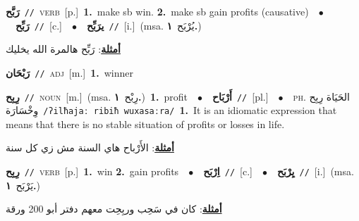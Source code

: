 \documentclass[10pt,a4paper,twoside]{article} %
\begin{document}
\begin{multicols}{2}
{\setlength\topsep{0pt}\textbf{\foreignlanguage{arabic}{رَبَّح}}\ {\color{gray}\texttt{//}\color{black}}\ \textsc{verb}\ [p.]\ \textbf{1.}~make sb win.  \textbf{2.}~make sb gain profits (causative)\ \ $\bullet$\ \ \setlength\topsep{0pt}\textbf{\foreignlanguage{arabic}{رَبِّح}}\ {\color{gray}\texttt{//}\color{black}}\ [c.]\ \ $\bullet$\ \ \setlength\topsep{0pt}\textbf{\foreignlanguage{arabic}{يرَبِّح}}\ {\color{gray}\texttt{//}\color{black}}\ [i.]\ \color{gray}(msa. \foreignlanguage{arabic}{يُرْبَح}~\foreignlanguage{arabic}{\textbf{١.}})\color{black}\  \begin{flushright}\color{gray}\foreignlanguage{arabic}{\textbf{\underline{\foreignlanguage{arabic}{أمثلة}}}: رَبِّح هالمرة الله يخليك}\end{flushright}\color{black}} \vspace{2mm}

{\setlength\topsep{0pt}\textbf{\foreignlanguage{arabic}{رَبْحَان}}\ {\color{gray}\texttt{//}\color{black}}\ \textsc{adj}\ [m.]\ \textbf{1.}~winner\ } \vspace{2mm}

{\setlength\topsep{0pt}\textbf{\foreignlanguage{arabic}{رِبِح}}\ {\color{gray}\texttt{//}\color{black}}\ \textsc{noun}\ [m.]\ \color{gray}(msa. \foreignlanguage{arabic}{رِبْح}~\foreignlanguage{arabic}{\textbf{١.}})\color{black}\ \textbf{1.}~profit\ \ $\bullet$\ \ \setlength\topsep{0pt}\textbf{\foreignlanguage{arabic}{أَرْبَاح}}\ {\color{gray}\texttt{//}\color{black}}\ [pl.]\ \ $\bullet$\ \ \textsc{ph.} \color{gray} \foreignlanguage{arabic}{الحَيَاة رِبِح وِخْسَارَة}\color{black}\ {\color{gray}\texttt{/{\sffamily ʔilħajaː ribiħ wuxasaːra}/}\color{black}}\ \textbf{1.}~It is an idiomatic expression that means that there is no stable situation of profits or losses in life.\  \begin{flushright}\color{gray}\foreignlanguage{arabic}{\textbf{\underline{\foreignlanguage{arabic}{أمثلة}}}: الأَرْباح هاي السنة مش زي كل سنة}\end{flushright}\color{black}} \vspace{2mm}

{\setlength\topsep{0pt}\textbf{\foreignlanguage{arabic}{رِبِح}}\ {\color{gray}\texttt{//}\color{black}}\ \textsc{verb}\ [p.]\ \textbf{1.}~win  \textbf{2.}~gain profits\ \ $\bullet$\ \ \setlength\topsep{0pt}\textbf{\foreignlanguage{arabic}{اِرْبَح}}\ {\color{gray}\texttt{//}\color{black}}\ [c.]\ \ $\bullet$\ \ \setlength\topsep{0pt}\textbf{\foreignlanguage{arabic}{يِرْبَح}}\ {\color{gray}\texttt{//}\color{black}}\ [i.]\ \color{gray}(msa. \foreignlanguage{arabic}{يَرْبَح}~\foreignlanguage{arabic}{\textbf{١.}})\color{black}\  \begin{flushright}\color{gray}\foreignlanguage{arabic}{\textbf{\underline{\foreignlanguage{arabic}{أمثلة}}}: كان في سَحِب وربِحِت معهم دفتر أبو 200 ورقة}\end{flushright}\color{black}} \vspace{2mm}


\end{multicols}
\end{document}
